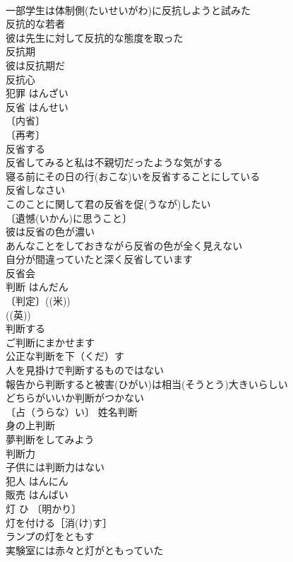 \documentclass[8pt]{extreport}
\begin{document}
\begin{CJK}{UTF8}{min}
\\	一部学生は体制側(たいせいがわ)に反抗しようと試みた 
\\	反抗的な若者 
\\	彼は先生に対して反抗的な態度を取った 
\\	反抗期 
\\	彼は反抗期だ 
\\	反抗心 
\\	犯罪	はんざい	
\\	反省	はんせい	
\\	〔内省〕
\\	〔再考〕
\\	反省する 
\\	反省してみると私は不親切だったような気がする 
\\	寝る前にその日の行(おこな)いを反省することにしている 
\\	反省しなさい 
\\	このことに関して君の反省を促(うなが)したい 
\\	〔遺憾(いかん)に思うこと〕
\\	彼は反省の色が濃い 
\\	あんなことをしておきながら反省の色が全く見えない 
\\	自分が間違っていたと深く反省しています 
\\	反省会 
\\	判断	はんだん	
\\	〔判定〕((米)) 
\\	((英)) 
\\	判断する 
\\	ご判断にまかせます 
\\	公正な判断を下（くだ）す 
\\	人を見掛けで判断するものではない 
\\	報告から判断すると被害(ひがい)は相当(そうとう)大きいらしい 
\\	どちらがいいか判断がつかない 
\\	〔占（うらな）い〕 姓名判断 
\\	身の上判断 
\\	夢判断をしてみよう 
\\	判断力 
\\	子供には判断力はない 
\\	犯人	はんにん	
\\	販売	はんばい	
\\	灯	ひ	〔明かり〕
\\	灯を付ける［消(け)す］ 
\\	ランプの灯をともす 
\\	実験室には赤々と灯がともっていた 

\end{CJK}
\end{document}
